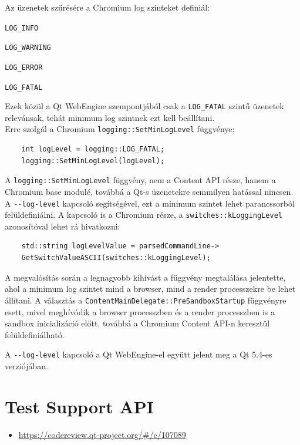 \documentclass[12pt]{report}
\let\origurl\url
\renewcommand{\url}[1]{%
    \textcolor{blue}{\origurl{#1}}
}
\newcommand{\gerrit}[1]{%
    \textcolor{qtgreen}{\origurl{https://codereview.qt-project.org/\#/c/#1}}
}
\begin{document}
\pagebreak
\noindent
Az üzenetek szűrésére a Chromium log szinteket definiál:
\begin{description}[
            labelsep=-0.5cm,
            itemsep=0cm,
            before={\renewcommand\makelabel[1]{\bfseries ##1}}]
    \item[0] \texttt{LOG\_INFO}
    \item[1] \texttt{LOG\_WARNING}
    \item[2] \texttt{LOG\_ERROR}
    \item[3] \texttt{LOG\_FATAL}
\end{description}
Ezek közül a Qt WebEngine szempontjából csak a \texttt{LOG\_FATAL} szintű üzenetek
relevánsak, tehát minimum log szintnek ezt kell beállítani. \\
Erre szolgál a Chromium \texttt{logging::SetMinLogLevel} függvénye:
\begin{verbatim}
    int logLevel = logging::LOG_FATAL;
    logging::SetMinLogLevel(logLevel);
\end{verbatim}
A \texttt{logging::SetMinLogLevel} függvény, nem a Content API része, hanem a \\
Chromium base modulé, továbbá a Qt-s üzenetekre semmilyen hatással nincsen. \\
A \texttt{-{}-log-level} kapcsoló segítségével, ezt a minimum szintet lehet
parancssorból felüldefiniálni. A kapcsoló is a Chromium része, a
\texttt{switches::kLoggingLevel} azonosítóval lehet rá hivatkozni:
\begin{verbatim}
    std::string logLevelValue = parsedCommandLine->
    GetSwitchValueASCII(switches::kLoggingLevel);
\end{verbatim}

A megvalósítás során a legnagyobb kihívást a függvény megtalálása jelentette, ahol a minimum
log szintet mind a browser, mind a render processzekre be lehet állítani.
A választás a \texttt{ContentMainDelegate::PreSandboxStartup} függvényre esett, mivel
meghívódik a browser processzben és a render processzben is a sandbox inicializáció előtt,
továbbá a Chromium Content API-n keresztül felüldefiniálható.

A \texttt{-{}-log-level} kapcsoló a Qt WebEngine-el együtt jelent meg a Qt 5.4-es
verziójában.


\section{Test Support API}

\begin{center}
    \begin{reviewbox}
        \begin{itemize}
            \renewcommand{\labelitemi}{\textcolor{qtgreen}{$\blacktriangleright$}}
            \item \gerrit{107089}
        \end{itemize}
    \end{reviewbox}
\end{center}
\end{document}
